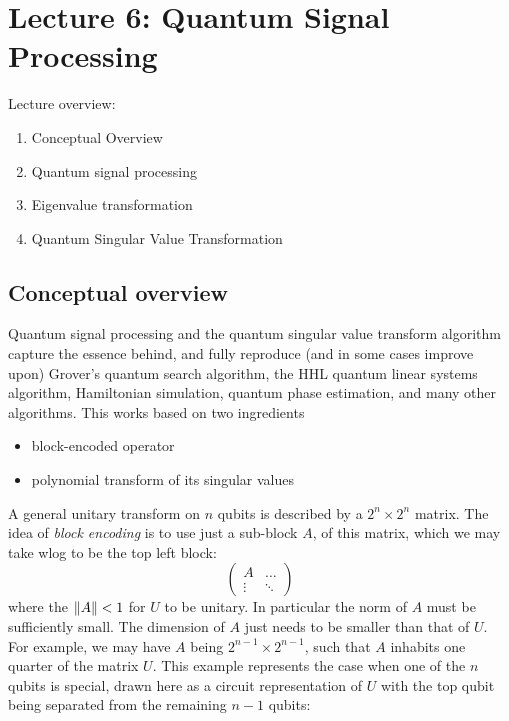 \section{Lecture 6: Quantum Signal Processing}
Lecture overview:
\begin{enumerate}[label=(\Roman*)]
    \item Conceptual Overview
    \item Quantum signal processing
    \item Eigenvalue transformation
    \item Quantum Singular Value Transformation
\end{enumerate}

\subsection{Conceptual overview}
Quantum signal processing and the quantum singular value transform algorithm capture the essence behind, and fully reproduce (and in some cases improve upon) Grover's quantum search algorithm, the HHL quantum linear systems algorithm, Hamiltonian simulation, quantum phase estimation, and many other algorithms. This works based on two ingredients
\begin{itemize}
    \item block-encoded operator
    \item polynomial transform of its singular values
\end{itemize}

A general unitary transform on $n$ qubits is described by a $2^n \times 2^n$ matrix. The idea of \textit{block encoding} is to use just a sub-block $A$,  of this matrix, which we may take wlog to be the top left block:
\begin{equation}
    \begin{pmatrix}
        A & \ldots \\
        \vdots & \ddots
    \end{pmatrix}
\end{equation}
where the $\norm{A} < 1$ for $U$ to be unitary. In particular the norm of $A$ must be sufficiently small. The dimension of $A$ just needs to be smaller than that of $U$. For example, we may have $A$ being $2^{n-1} \times 2^{n-1}$, such that $A$ inhabits one quarter of the matrix $U$. This example represents the case when one of the $n$ qubits is special, drawn here as a circuit representation of $U$ with the top qubit being separated from the remaining $n - 1$ qubits:




